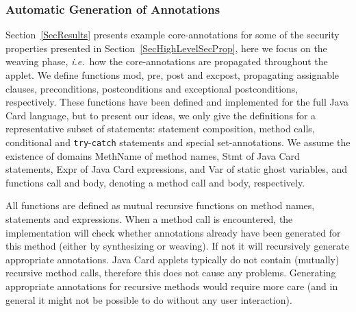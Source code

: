 \subsubsection{Automatic Generation of Annotations}

Section~\ref{SecResults} presents example core-annotations for some of
the security properties presented in
Section~\ref{SecHighLevelSecProp}, here we focus on the weaving phase,
\emph{i.e.}~how the core-annotations are propagated throughout the
applet. We define functions \textsf{mod}, \textsf{pre}, \textsf{post} and
\textsf{exc\-post}, propagating assignable clauses, preconditions, 
postconditions and exceptional postconditions, respectively. These
functions have been defined and implemented for the full Java Card
language, but to present our ideas, we only give the definitions for a
representative subset of statements: statement composition, method
calls, conditional and \texttt{try}-\texttt{catch} statements and
special set-annotations. We assume the existence of domains
\textsf{MethName} of method names, \textsf{Stmt} of Java Card
statements, \textsf{Expr} of Java Card expressions, and \textsf{Var}
of static ghost variables, and functions
\textsf{call} and \textsf{body}, denoting a method call and 
body, respectively.

All functions are defined as mutual recursive functions on method
names, statements and expressions. When a method call is encountered,
the implementation will check whether annotations already have been
generated for this method (either by synthesizing or weaving). If not
it will recursively generate appropriate annotations. Java Card
applets typically do not contain (mutually) recursive method calls,
therefore this does not cause any problems. Generating appropriate
annotations for recursive methods would require more care (and in
general it might not be possible to do without any user interaction).


